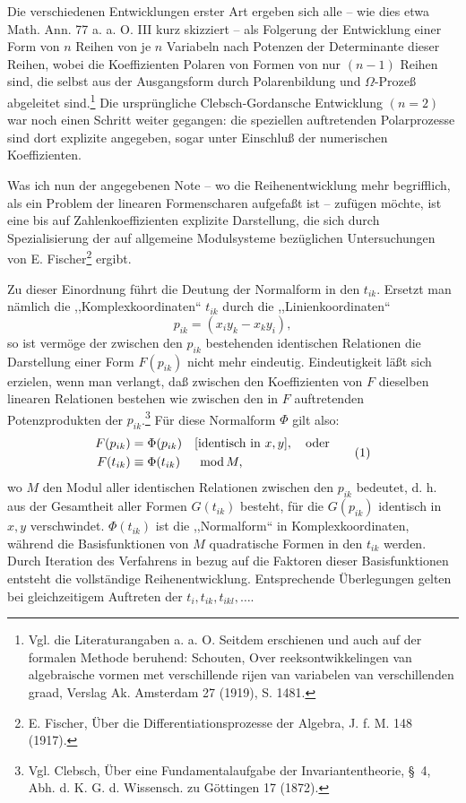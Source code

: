 \documentclass[11pt]{article}
\newcommand{\modu}[1]{\;\operatorname{mod} #1}
\providecommand{\modu}[1]{\;\operatorname{mod} #1}
\begin{document}
Die verschiedenen Entwicklungen erster Art ergeben sich alle -- wie dies etwa Math. Ann. 77 a. a. O. III kurz skizziert -- als Folgerung der Entwicklung einer Form von $n$ Reihen von je $n$ Variabeln nach Potenzen der Determinante dieser Reihen, wobei die Koeffizienten Polaren von Formen von nur $(n-1)$ Reihen sind, die selbst aus der Ausgangsform durch Polarenbildung und $\Omega$-Prozeß abgeleitet sind.\footnote{Vgl. die Literaturangaben a. a. O. Seitdem erschienen und auch auf der formalen Methode beruhend: Schouten, Over reeksontwikkelingen van algebraische vormen met verschillende rijen van variabelen van verschillenden graad, Verslag Ak. Amsterdam 27 (1919), S. 1481.} Die ursprüngliche Clebsch-Gordansche Entwicklung $(n=2)$ war noch einen Schritt weiter gegangen: die speziellen auftretenden Polarprozesse sind dort explizite angegeben, sogar unter Einschluß der numerischen Koeffizienten.

Was ich nun der angegebenen Note -- wo die Reihenentwicklung mehr begrifflich, als ein Problem der linearen Formenscharen aufgefaßt ist -- zufügen möchte, ist eine bis auf Zahlenkoeffizienten explizite Darstellung, die sich durch Spezialisierung der auf allgemeine Modulsysteme bezüglichen Untersuchungen von E. Fischer\footnote{E. Fischer, Über die Differentiationsprozesse der Algebra, J. f. M. 148 (1917).} ergibt.

Zu dieser Einordnung führt die Deutung der Normalform in den $t_{ik}$. Ersetzt man nämlich die ,,Komplexkoordinaten`` $t_{ik}$ durch die ,,Linienkoordinaten``
\[
        p_{ik}=(x_i y_k-x_k y_i),
\]
so ist vermöge der zwischen den $p_{ik}$ bestehenden identischen Relationen die Darstellung einer Form $F(p_{ik})$ nicht mehr eindeutig. Eindeutigkeit läßt sich erzielen, wenn man verlangt, daß zwischen den Koeffizienten von $F$ dieselben linearen Relationen bestehen wie zwischen den in $F$ auftretenden Potenzprodukten der $p_{ik}$.\footnote{Vgl. Clebsch, Über eine Fundamentalaufgabe der Invariantentheorie, \S~4, Abh. d. K. G. d. Wissensch. zu Göttingen 17 (1872).} Für diese Normalform $\Phi$ gilt also:
\begin{equation}
\begin{aligned}
        F(p_{ik})&=\Phi(p_{ik}) &&[\text{identisch in }x,y],\quad\text{oder}\notag\\
        F(t_{ik})&\equiv\Phi(t_{ik}) &&\modu{M},
\end{aligned}
\tag{1}
\end{equation}
wo $M$ den Modul aller identischen Relationen zwischen den $p_{ik}$ bedeutet, d. h. aus der Gesamtheit aller Formen $G(t_{ik})$ besteht, für die $G(p_{ik})$ identisch in $x,y$ verschwindet. $\Phi(t_{ik})$ ist die ,,Normalform`` in Komplexkoordinaten, während die Basisfunktionen von $M$ quadratische Formen in den $t_{ik}$ werden. Durch Iteration des Verfahrens in bezug auf die Faktoren dieser Basisfunktionen entsteht die vollständige Reihenentwicklung. Entsprechende Überlegungen gelten bei gleichzeitigem Auftreten der $t_i,t_{ik},t_{ikl},\ldots$.
\end{document}
